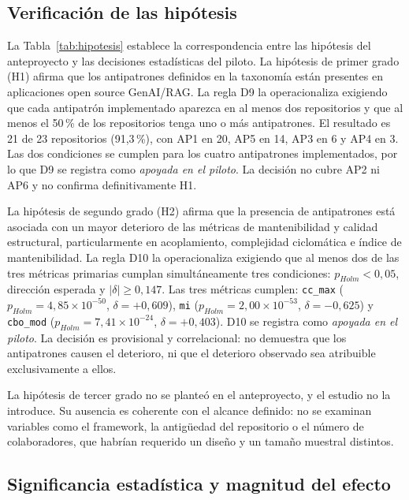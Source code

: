 \subsection{Verificación de las hipótesis}

La Tabla~\ref{tab:hipotesis} establece la correspondencia entre las hipótesis del anteproyecto y las decisiones estadísticas del piloto. La hipótesis de primer grado (H1) afirma que los antipatrones definidos en la taxonomía están presentes en aplicaciones open source GenAI/RAG. La regla D9 la operacionaliza exigiendo que cada antipatrón implementado aparezca en al menos dos repositorios y que al menos el 50\,\% de los repositorios tenga uno o más antipatrones. El resultado es 21 de 23 repositorios (91,3\,\%), con AP1 en 20, AP5 en 14, AP3 en 6 y AP4 en 3. Las dos condiciones se cumplen para los cuatro antipatrones implementados, por lo que D9 se registra como \emph{apoyada en el piloto}. La decisión no cubre AP2 ni AP6 y no confirma definitivamente H1.



La hipótesis de segundo grado (H2) afirma que la presencia de antipatrones está asociada con un mayor deterioro de las métricas de mantenibilidad y calidad estructural, particularmente en acoplamiento, complejidad ciclomática e índice de mantenibilidad. La regla D10 la operacionaliza exigiendo que al menos dos de las tres métricas primarias cumplan simultáneamente tres condiciones: $p_{Holm}<0{,}05$, dirección esperada y $|\delta|\geq0{,}147$. Las tres métricas cumplen: \texttt{cc\_max} ($p_{Holm}=4{,}85\times10^{-50}$, $\delta=+0{,}609$), \texttt{mi} ($p_{Holm}=2{,}00\times10^{-53}$, $\delta=-0{,}625$) y \texttt{cbo\_mod} ($p_{Holm}=7{,}41\times10^{-24}$, $\delta=+0{,}403$). D10 se registra como \emph{apoyada en el piloto}. La decisión es provisional y correlacional: no demuestra que los antipatrones causen el deterioro, ni que el deterioro observado sea atribuible exclusivamente a ellos.

La hipótesis de tercer grado no se planteó en el anteproyecto, y el estudio no la introduce. Su ausencia es coherente con el alcance definido: no se examinan variables como el framework, la antigüedad del repositorio o el número de colaboradores, que habrían requerido un diseño y un tamaño muestral distintos.

\subsection{Significancia estadística y magnitud del efecto}

